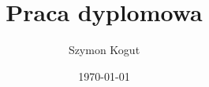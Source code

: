 \documentclass[10pt]{book}
\title{Praca dyplomowa}
\author{\Huge Szymon Kogut}
\date{\today}
\renewcommand{\contentsname}{Spis treści}
\begin{document}



\normalsize

\setcounter{page}{-101}

\null
\newpage


\newpage


\newpage

\renewcommand{\contentsname}{\vspace{-2.5em}Spis treści}
\renewcommand\listfigurename{\vspace{-2.5em}Spis rysunków}
\tableofcontents
\newpage
\listoffigures
\newpage

\setcounter{page}{1}


\newpage


\newpage


\newpage


\newpage


\newpage


\newpage


\newpage


\newpage


\newpage


\newpage


\newpage


\newpage
\end{document}
